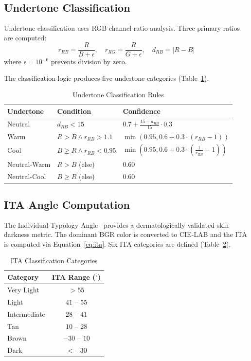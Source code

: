 \documentclass[conference]{IEEEtran}
\begin{document}
\subsection{Undertone Classification}

Undertone classification uses RGB channel ratio analysis. Three primary ratios are computed:
\begin{equation}
r_{RB} = \frac{R}{B + \epsilon}, \quad r_{RG} = \frac{R}{G + \epsilon}, \quad d_{RB} = |R - B|
\end{equation}
where $\epsilon = 10^{-6}$ prevents division by zero.

The classification logic produces five undertone categories (Table~\ref{tab:undertone_rules}).

\begin{table}[t]
\centering
\caption{Undertone Classification Rules}
\label{tab:undertone_rules}
\begin{tabular}{lll}
\toprule
\textbf{Undertone} & \textbf{Condition} & \textbf{Confidence} \\
\midrule
Neutral & $d_{RB} < 15$ & $0.7 + \frac{15 - d_{RB}}{15} \cdot 0.3$ \\
Warm & $R > B \wedge r_{RB} > 1.1$ & $\min(0.95, 0.6 + 0.3 \cdot (r_{RB} - 1))$ \\
Cool & $B \geq R \wedge r_{RB} < 0.95$ & $\min(0.95, 0.6 + 0.3 \cdot (\frac{1}{r_{RB}} - 1))$ \\
Neutral-Warm & $R > B$ (else) & $0.60$ \\
Neutral-Cool & $B \geq R$ (else) & $0.60$ \\
\bottomrule
\end{tabular}
\end{table}

\subsection{ITA Angle Computation}

The Individual Typology Angle~\cite{chardon1991} provides a dermatologically validated skin darkness metric. The dominant BGR color is converted to CIE-LAB and the ITA is computed via Equation~\ref{eq:ita}. Six ITA categories are defined (Table~\ref{tab:ita_categories}).

\begin{table}[t]
\centering
\caption{ITA Classification Categories}
\label{tab:ita_categories}
\begin{tabular}{lc}
\toprule
\textbf{Category} & \textbf{ITA Range ($^{\circ}$)} \\
\midrule
Very Light & $> 55$ \\
Light & $41$ -- $55$ \\
Intermediate & $28$ -- $41$ \\
Tan & $10$ -- $28$ \\
Brown & $-30$ -- $10$ \\
Dark & $< -30$ \\
\bottomrule
\end{tabular}
\end{table}
\end{document}
